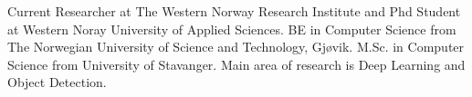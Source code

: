 

\begin{cvparagraph}

Current Researcher at The Western Norway Research Institute and Phd Student at Western Noray University of Applied Sciences. BE in Computer Science from The Norwegian University of Science and Technology, Gjøvik. M.Sc. in Computer Science from University of Stavanger. Main area of research is Deep Learning and Object Detection. 
\end{cvparagraph}
